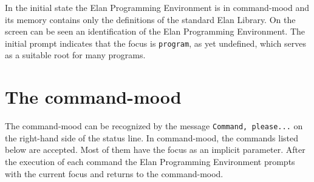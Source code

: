 In the initial state the Elan Programming Environment is in
command-mood and its memory contains only the definitions of
the standard Elan Library. On the screen can be seen an identification
of the Elan Programming Environment. The initial prompt indicates
that the focus is {\tt program}, as yet undefined, which serves
as a suitable root for many programs.

\section{The command-mood}
 
The command-mood can be recognized by the message {\tt Command, please...}
on the right-hand side of the status line. In command-mood, the
commands listed below are accepted. Most of them have the focus
as an implicit parameter. After the execution of each command
the Elan Programming Environment prompts with the current focus
and returns to the command-mood.

